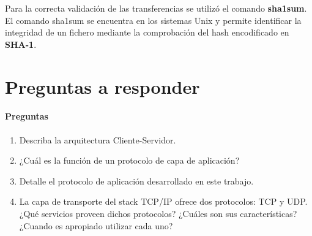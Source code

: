 \documentclass[11pt,a4paper]{article}
\begin{document}
Para la correcta validación de las transferencias se utilizó el comando \textbf{sha1sum}. El comando sha1sum se encuentra en los sistemas Unix y permite identificar la integridad de un fichero mediante la comprobación del hash encodificado en \textbf{SHA-1}.

\newpage



\newpage

\section{Preguntas a responder}

\paragraph{Preguntas}

\begin{enumerate}
    \item Describa la arquitectura Cliente-Servidor.
    \item ¿Cuál es la función de un protocolo de capa de aplicación?
    \item Detalle el protocolo de aplicación desarrollado en este trabajo.
    \item La capa de transporte del stack TCP/IP ofrece dos protocolos: TCP y UDP. ¿Qué servicios proveen dichos protocolos? ¿Cuáles son sus características? ¿Cuando es apropiado utilizar cada uno?
\end{enumerate}
\end{document}
